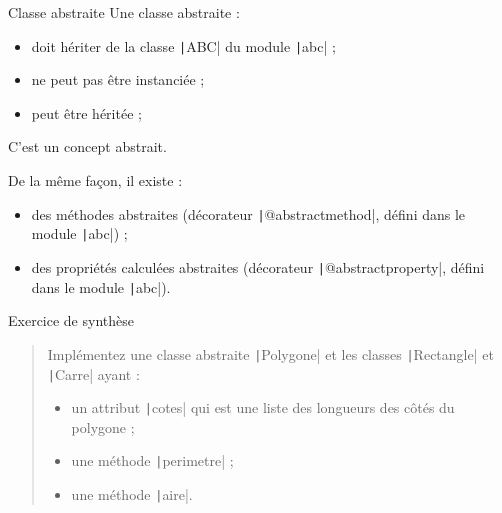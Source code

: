 \documentclass[10pt]{beamer}
\begin{document}
\begin{frame}[fragile]{Classe abstraite}
  Une classe abstraite :

  \begin{itemize}
    \item doit hériter de la classe \texttt|ABC| du module \texttt|abc| ;
    \item ne peut pas être instanciée ;
    \item peut être héritée ;
  \end{itemize}

  C'est un \alert{concept abstrait}.

  \pause

  De la même façon, il existe :

  \begin{itemize}
    \item des méthodes abstraites (décorateur \texttt|@abstractmethod|, défini dans le module \texttt|abc|) ;
    \item des propriétés calculées abstraites (décorateur \texttt|@abstractproperty|, défini dans le module \texttt|abc|).
  \end{itemize}
\end{frame}

\begin{frame}[fragile]{Exercice de synthèse}
  \begin{quote}
    Implémentez une classe abstraite \texttt|Polygone| et les classes \texttt|Rectangle| et \texttt|Carre| ayant :
    \begin{itemize}
      \item un attribut \texttt|cotes| qui est une liste des longueurs des côtés du polygone ;
      \item une méthode \texttt|perimetre| ;
      \item une méthode \texttt|aire|.
    \end{itemize}
  \end{quote}
\end{frame}
\end{document}
